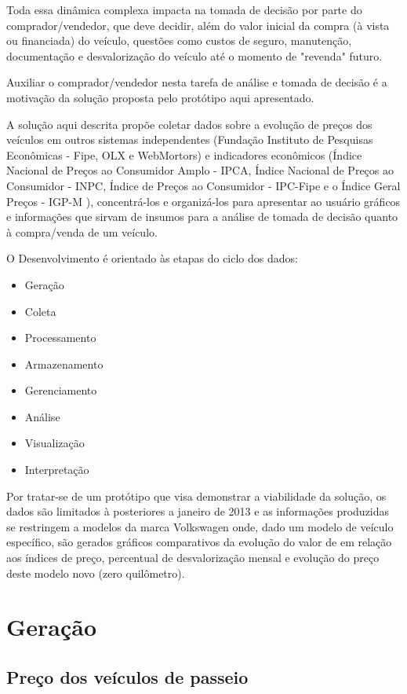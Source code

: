 \documentclass[conference]{IEEEtran}
\begin{document}
Toda essa dinâmica complexa impacta na tomada de decisão por parte do comprador/vendedor, que deve decidir, além do valor inicial da compra (à vista ou financiada) do veículo, questões como custos de seguro, manutenção, documentação e desvalorização do veículo até o momento de "revenda" futuro.

Auxiliar o comprador/vendedor nesta tarefa de análise e tomada de decisão é a motivação da solução proposta pelo protótipo aqui apresentado.

A solução aqui descrita propõe coletar dados sobre a evolução de preços dos veículos em outros sistemas independentes (Fundação Instituto de Pesquisas Econômicas - Fipe, OLX e WebMortors) e indicadores econômicos (Índice Nacional de Preços ao Consumidor Amplo - IPCA, Índice Nacional de Preços ao Consumidor - INPC, Índice de Preços ao Consumidor - IPC-Fipe e o Índice Geral Preços - IGP-M ), concentrá-los e organizá-los para apresentar ao usuário gráficos e informações que sirvam de insumos para a análise de tomada de decisão quanto à compra/venda de um veículo.

O Desenvolvimento é orientado às etapas do ciclo dos dados:

\begin{itemize}
	\item Geração
	\item Coleta
	\item Processamento
	\item Armazenamento
	\item Gerenciamento
	\item Análise
	\item Visualização
	\item Interpretação
\end{itemize}

Por tratar-se de um protótipo que visa demonstrar a viabilidade da solução, os dados são limitados à posteriores a janeiro de 2013 e as informações produzidas se restringem a modelos da marca Volkswagen onde, dado um modelo de veículo específico, são gerados gráficos comparativos da evolução do valor de em relação aos índices de preço, percentual de desvalorização mensal e evolução do preço deste modelo novo (zero quilômetro).

\section{Geração}

\subsection{Preço dos veículos de passeio }
\end{document}
